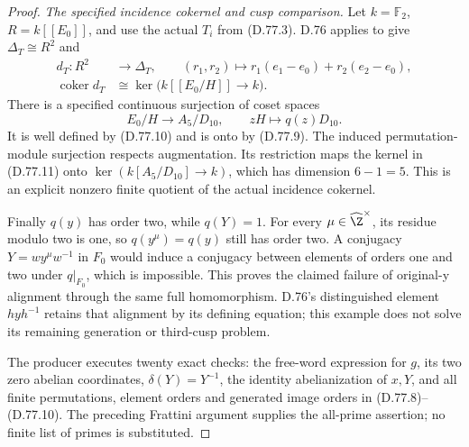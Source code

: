 \begin{proof}
\emph{The specified incidence cokernel and cusp comparison.}
Let $k=\mathbb F_2$, $R=k[[E_0]]$, and use the actual
$T_i$ from (D.77.3). D.76 applies to give
$\Delta_T\cong R^2$ and
\[
 \begin{aligned}
 d_T:R^2&\longrightarrow\Delta_T,\qquad
 (r_1,r_2)\longmapsto r_1(e_1-e_0)+r_2(e_2-e_0),\\
 \operatorname{coker}d_T
      &\cong\ker\bigl(k[[E_0/H]]\to k\bigr).
 \end{aligned}                                                \tag{D.77.11}
\]
There is a specified continuous surjection of coset spaces
\[
 E_0/H\longrightarrow A_5/D_{10},\qquad
                         zH\longmapsto q(z)D_{10}.
                                                               \tag{D.77.12}
\]
It is well defined by (D.77.10) and is onto by (D.77.9).
The induced permutation-module surjection respects
augmentation. Its restriction maps the kernel in
(D.77.11) onto
$\ker(k[A_5/D_{10}]\to k)$, which has dimension
$6-1=5$. This is an explicit nonzero finite quotient
of the actual incidence cokernel.

Finally $q(y)$ has order two, while $q(Y)=1$.
For every $\mu\in\widehat\Z^\times$, its residue modulo
two is one, so $q(y^\mu)=q(y)$ still has order two.
A conjugacy $Y=w y^\mu w^{-1}$ in $F_0$ would induce
a conjugacy between elements of orders one and two
under $q|_{F_0}$, which is impossible.
This proves the claimed failure of original-y alignment
through the same full homomorphism.
D.76's distinguished element $hyh^{-1}$ retains that
alignment by its defining equation; this example does
not solve its remaining generation or third-cusp problem.

The producer
executes twenty exact checks: the free-word expression
for $g$, its two zero abelian coordinates,
$\delta(Y)=Y^{-1}$, the identity abelianization
of $x,Y$, and all finite permutations, element orders
and generated image orders in (D.77.8)--(D.77.10).
The preceding Frattini argument supplies the
all-prime assertion; no finite list of primes is substituted.
\end{proof}
